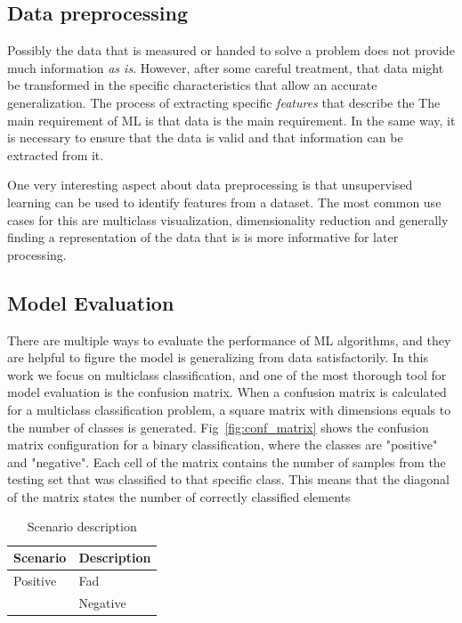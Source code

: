 \subsection{Data preprocessing}
Possibly the data that is measured or handed to solve a problem does not provide much information \emph{as is}. However, after some careful treatment, that data might be transformed in the specific characteristics that allow an accurate generalization. The process of extracting specific \emph{features} that describe the
The main requirement of \ac{ML} is that data is the main requirement. In the same way, it is necessary to ensure that the data is valid and that information can be extracted from it.

One very interesting aspect about data preprocessing is that unsupervised learning can be used to identify features from a dataset. The most common use cases for this are multiclass visualization, dimensionality reduction and generally finding a representation of the data that is is more informative for later processing.

\subsection{Model Evaluation}
There are multiple ways to evaluate the performance of \ac{ML} algorithms, and they are helpful to figure the model is generalizing from data satisfactorily. In this work we focus on multiclass classification, and one of the most thorough tool for model evaluation is the confusion matrix. When a confusion matrix is calculated for a multiclass classification problem, a square matrix with dimensions equals to the number of classes is generated. Fig~\ref{fig:conf_matrix} shows the confusion matrix configuration for a binary classification, where the classes are "positive" and "negative". Each cell of the matrix contains the number of samples from the testing set that was classified to that specific class. This means that the diagonal of the matrix states the number of correctly classified elements

\begin{table}[h!]
    \centering
    \begin{tabular}{| >{\centering}m{5em}| m{5em} |}
        \hline
        \textbf{Scenario} & \multicolumn{1}{|c|}{\textbf{Description}} \\
        \hline
        Positive & Fad \\\hline
        1 & Negative\\\hline
    \end{tabular}
    \caption{Scenario description}
    \label{table:scenarios}
\end{table}

